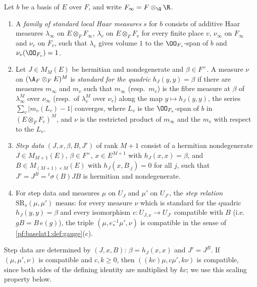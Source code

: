 \begin{definition}\label{pf:baselat1:def:stdmeas}
Let $b$ be a basis of $E$ over $F$, and write $F_\infty=F\otimes_\Q\R$.
\begin{enumerate}[label=(\alph*)]
\item A \emph{family of standard local Haar measures} $s$ for $b$ consists of additive Haar measures $\lambda_\infty$ on
  $E\otimes_FF_\infty$, $\lambda_v$ on $E\otimes_FF_v$ for every finite place $v$, $\nu_\infty$ on $F_\infty$ and $\nu_v$
  on $F_v$, such that $\lambda_v$ gives volume $1$ to the $\OO_{F_v}$-span of $b$ and $\nu_v(\OO_{F_v})=1$.
\item Let $J\in M_M(E)$ be hermitian and nondegenerate and $\beta\in F^\times$. A measure $\nu$ on
  $(\A_F\otimes_FE)^M$ is \emph{standard for the quadric} $h_J(y,y)=\beta$ if there are measures $m_\infty$ and $m_v$ such that
  $m_\infty$ (resp.\ $m_v$) is the fibre measure at $\beta$ of $\lambda_\infty^M$ over $\nu_\infty$ (resp.\ of $\lambda_v^M$
  over $\nu_v$) along the map $y\mapsto h_J(y,y)$, the series $\sum_v|m_v(L_v)-1|$ converges, where $L_v$ is the
  $\OO_{F_v}$-span of $b$ in $(E\otimes_FF_v)^M$, and $\nu$ is the restricted product of $m_\infty$ and the $m_v$ with
  respect to the $L_v$.
\item \emph{Step data} $(J,x,\beta,B,J')$ of rank $M+1$ consist of a hermitian nondegenerate $J\in M_{M+1}(E)$,
  $\beta\in F^\times$, $x\in E^{M+1}$ with $h_J(x,x)=\beta$, and $B\in M_{(M+1)\times M}(E)$ with $h_J(x,B_{\cdot j})=0$ for
  all $j$, such that $J'=J^B={}^t\!\sigma(B)JB$ is hermitian and nondegenerate.
\item For step data and measures $\mu$ on $U_J$ and $\mu'$ on $U_{J'}$, the \emph{step relation}
  $\mathrm{SR}_s(\mu,\mu')$ means: for every measure $\nu$ which is standard for the quadric $h_J(y,y)=\beta$ and every
  isomorphism $e\colon U_{J,x}\to U_{J'}$ compatible with $B$ (i.e.\ $gB=B\,e(g)$), the triple
  $(\mu,e^{-1}_*\mu',\nu)$ is compatible in the sense of \cref{pf:baselat1:def:gauge}(c).
\end{enumerate}
%
\end{definition}

Step data are determined by $(J,x,B)$: $\beta=h_J(x,x)$ and $J'=J^B$. If $(\mu,\mu',\nu)$ is compatible and
$c,k\ge0$, then $((kc)\mu,c\mu',k\nu)$ is compatible, since both sides of the defining identity are multiplied by
$kc$; we use this scaling property below.

